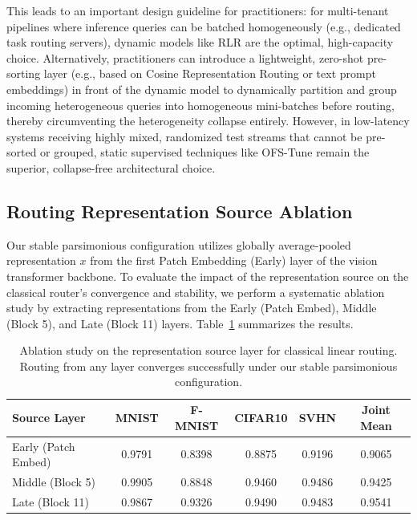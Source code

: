 This leads to an important design guideline for practitioners: for multi-tenant pipelines where inference queries can be batched homogeneously (e.g., dedicated task routing servers), dynamic models like RLR are the optimal, high-capacity choice. Alternatively, practitioners can introduce a lightweight, zero-shot pre-sorting layer (e.g., based on Cosine Representation Routing or text prompt embeddings) in front of the dynamic model to dynamically partition and group incoming heterogeneous queries into homogeneous mini-batches before routing, thereby circumventing the heterogeneity collapse entirely. However, in low-latency systems receiving highly mixed, randomized test streams that cannot be pre-sorted or grouped, static supervised techniques like OFS-Tune remain the superior, collapse-free architectural choice.

\subsection{Routing Representation Source Ablation}
Our stable parsimonious configuration utilizes globally average-pooled representation $x$ from the first Patch Embedding (Early) layer of the vision transformer backbone. To evaluate the impact of the representation source on the classical router's convergence and stability, we perform a systematic ablation study by extracting representations from the Early (Patch Embed), Middle (Block 5), and Late (Block 11) layers. Table~\ref{tab:ablation} summarizes the results.

\begin{table}[h]
\caption{Ablation study on the representation source layer for classical linear routing. Routing from any layer converges successfully under our stable parsimonious configuration.}
\label{tab:ablation}
\vskip 0.15in
\begin{center}
\begin{small}
\begin{sc}
\begin{tabular}{lccccc}
\toprule
Source Layer & MNIST & F-MNIST & CIFAR10 & SVHN & Joint Mean \\
\midrule
Early (Patch Embed) & 0.9791 & 0.8398 & 0.8875 & 0.9196 & 0.9065 \\
Middle (Block 5) & 0.9905 & 0.8848 & 0.9460 & 0.9486 & 0.9425 \\
Late (Block 11) & 0.9867 & 0.9326 & 0.9490 & 0.9483 & 0.9541 \\
\bottomrule
\end{tabular}
\end{sc}
\end{small}
\end{center}
\vskip -0.1in
\end{table}

